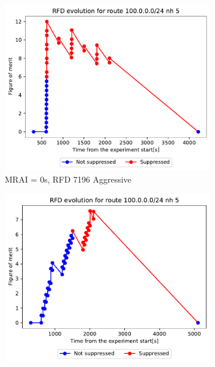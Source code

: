 \begin{figure}[h]
     \centering
     \begin{subfigure}[b]{0.49\textwidth}
         \centering
         \includegraphics[width=\textwidth]{images/RFD/clique/FigureOfMerit/mrai1_RFD_7196_aggressive_x_rfd_R1.pdf}
         \caption{MRAI = 0s, RFD 7196 Aggressive}
         \label{fig:clique_x_mrai0_rfd7196Aggressive}
     \end{subfigure}
     \hfill
     \begin{subfigure}[b]{0.49\textwidth}
         \centering
         \includegraphics[width=\textwidth]{images/RFD/clique/FigureOfMerit/mrai11_RFD_7196_aggressive_x_rfd_R1.pdf}

\end{subfigure}
\end{figure}
